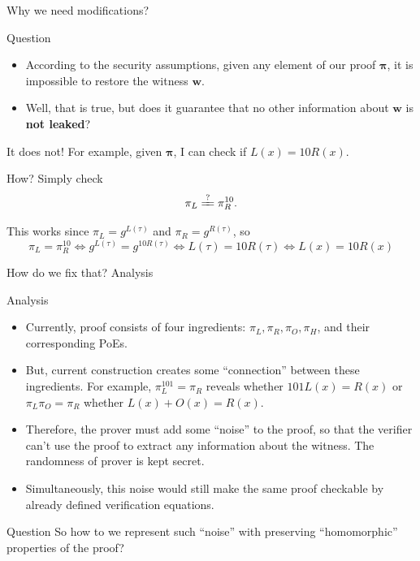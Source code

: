 \documentclass{zkdl-presentation-template}
\begin{document}
    \begin{frame}{Why we need modifications?}
        \begin{alertblock}{Question}
            \begin{itemize}[label=]
                \item According to the security assumptions, given any element of our proof $\boldsymbol{\pi}$, it is impossible to restore the witness $\boldsymbol{w}$.
                \item Well, that is true, but does it guarantee that no other information about $\boldsymbol{w}$ is \textbf{not leaked}?
            \end{itemize}

            It does not! For example, given $\boldsymbol{\pi}$, I can check if $L(x) = 10R(x)$. 
            
            How? Simply check
            \begin{equation*}
                \pi_L \xlongequal{?} \pi_R^{10}.
            \end{equation*}

             This works since $\pi_L = g^{L(\tau)}$ and $\pi_R = g^{R(\tau)}$, so
            \begin{equation*}
                \pi_L = \pi_R^{10} \Leftrightarrow g^{L(\tau)} = g^{10R(\tau)} \Leftrightarrow L(\tau) = 10R(\tau) \Leftrightarrow L(x) = 10R(x)
            \end{equation*}
        \end{alertblock}
    \end{frame}

    \begin{frame}{How do we fix that? Analysis}
        \begin{block}{Analysis}
            \begin{itemize}[label=]
                \item Currently, proof consists of four ingredients: $\pi_L, \pi_R, \pi_O, \pi_H$, and their corresponding PoEs. 
                \item But, current construction creates some ``connection'' between these ingredients. For example, $\pi_L^{101} = \pi_R$ reveals whether $101L(x)=R(x)$ or $\pi_L\pi_O=\pi_R$ whether $L(x) + O(x) = R(x)$. 
                \item Therefore, the prover must add some ``noise'' to the proof, so that the verifier can't use the proof to extract any information about the witness. The randomness of prover is kept secret. 
                \item Simultaneously, this noise would still make the same proof checkable by already defined verification equations.
            \end{itemize}
        \end{block}

        \begin{alertblock}{Question}
            So how to we represent such ``noise'' with preserving ``homomorphic'' properties of the proof?
        \end{alertblock}
    \end{frame}
\end{document}
